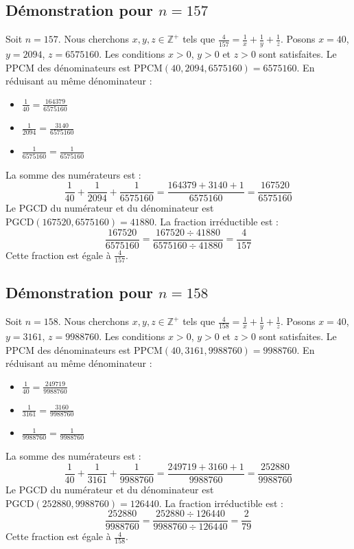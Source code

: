 \documentclass[11pt,a4paper]{article}
\begin{document}
\subsection{Démonstration pour $n = 157$}
Soit $n = 157$. Nous cherchons $x, y, z \in \mathbb{Z}^{+}$ tels que $\frac{4}{157} = \frac{1}{x} + \frac{1}{y} + \frac{1}{z}$.
Posons $x = 40$, $y = 2094$, $z = 6575160$.
Les conditions $x > 0$, $y > 0$ et $z > 0$ sont satisfaites.
Le PPCM des dénominateurs est $\text{PPCM}(40, 2094, 6575160) = 6575160$.
En réduisant au même dénominateur :
\begin{itemize}
    \item $\frac{1}{40} = \frac{164379}{6575160}$
    \item $\frac{1}{2094} = \frac{3140}{6575160}$
    \item $\frac{1}{6575160} = \frac{1}{6575160}$
\end{itemize}
La somme des numérateurs est :
$$ \frac{1}{40} + \frac{1}{2094} + \frac{1}{6575160} = \frac{164379 + 3140 + 1}{6575160} = \frac{167520}{6575160} $$
Le PGCD du numérateur et du dénominateur est $\text{PGCD}(167520, 6575160) = 41880$.
La fraction irréductible est :
$$ \frac{167520}{6575160} = \frac{167520 \div 41880}{6575160 \div 41880} = \frac{4}{157} $$
Cette fraction est égale à $\frac{4}{157}$.

\subsection{Démonstration pour $n = 158$}
Soit $n = 158$. Nous cherchons $x, y, z \in \mathbb{Z}^{+}$ tels que $\frac{4}{158} = \frac{1}{x} + \frac{1}{y} + \frac{1}{z}$.
Posons $x = 40$, $y = 3161$, $z = 9988760$.
Les conditions $x > 0$, $y > 0$ et $z > 0$ sont satisfaites.
Le PPCM des dénominateurs est $\text{PPCM}(40, 3161, 9988760) = 9988760$.
En réduisant au même dénominateur :
\begin{itemize}
    \item $\frac{1}{40} = \frac{249719}{9988760}$
    \item $\frac{1}{3161} = \frac{3160}{9988760}$
    \item $\frac{1}{9988760} = \frac{1}{9988760}$
\end{itemize}
La somme des numérateurs est :
$$ \frac{1}{40} + \frac{1}{3161} + \frac{1}{9988760} = \frac{249719 + 3160 + 1}{9988760} = \frac{252880}{9988760} $$
Le PGCD du numérateur et du dénominateur est $\text{PGCD}(252880, 9988760) = 126440$.
La fraction irréductible est :
$$ \frac{252880}{9988760} = \frac{252880 \div 126440}{9988760 \div 126440} = \frac{2}{79} $$
Cette fraction est égale à $\frac{4}{158}$.
\end{document}
